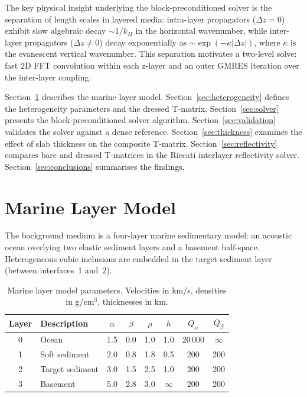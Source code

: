 \documentclass[11pt,a4paper]{article}
\theoremstyle{plain}
\theoremstyle{remark}
\begin{document}
The key physical insight underlying the block-preconditioned solver is
the separation of length scales in layered media: intra-layer
propagators ($\Delta z = 0$) exhibit slow algebraic decay
$\sim 1/k_H$ in the horizontal wavenumber, while inter-layer propagators
($\Delta z \ne 0$) decay exponentially as $\sim\exp(-\kappa|\Delta z|)$,
where $\kappa$ is the evanescent vertical wavenumber.  This separation
motivates a two-level solve: fast 2D FFT convolution within each
z-layer and an outer GMRES iteration over the inter-layer coupling.

Section~\ref{sec:model} describes the marine layer model.
Section~\ref{sec:heterogeneity} defines the heterogeneity parameters and
the dressed T-matrix.  Section~\ref{sec:solver} presents the
block-preconditioned solver algorithm.
Section~\ref{sec:validation} validates the solver against a dense
reference.  Section~\ref{sec:thickness} examines the effect of slab
thickness on the composite T-matrix.  Section~\ref{sec:reflectivity}
compares bare and dressed T-matrices in the Riccati interlayer
reflectivity solver.  Section~\ref{sec:conclusions} summarises the
findings.

\section{Marine Layer Model}\label{sec:model}

The background medium is a four-layer marine sedimentary model:
an acoustic ocean overlying two elastic sediment layers and a basement
half-space.  Heterogeneous cubic inclusions are embedded in the target
sediment layer (between interfaces~1 and~2).

\begin{table}[ht]
\centering
\renewcommand{\arraystretch}{1.2}
\caption{Marine layer model parameters.  Velocities in km/s, densities
in g/cm$^3$, thicknesses in km.}
\label{tab:model}
\begin{tabular}{clcccccc}
  \toprule
  \textbf{Layer} & \textbf{Description} & $\alpha$ & $\beta$
    & $\rho$ & $h$ & $Q_\alpha$ & $Q_\beta$ \\
  \midrule
  0 & Ocean           & 1.5 & 0.0 & 1.0 & 1.0    & 20\,000 & $\infty$ \\
  1 & Soft sediment   & 2.0 & 0.8 & 1.8 & 0.5    & 200     & 200 \\
  2 & Target sediment & 3.0 & 1.5 & 2.5 & 1.0    & 200     & 200 \\
  3 & Basement        & 5.0 & 2.8 & 3.0 & $\infty$ & 200   & 200 \\
  \bottomrule
\end{tabular}
\end{table}
\end{document}
